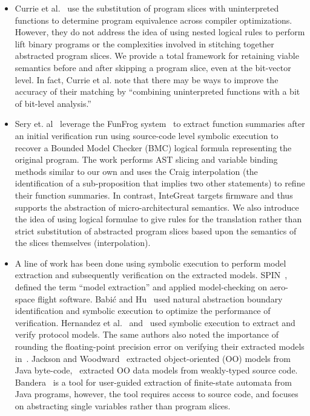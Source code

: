 \begin{itemize}
	\item Currie et al.~\cite{currie2006embedded} use the substitution of program slices with uninterpreted functions to determine program equivalence across compiler optimizations.
	However, they do not address the idea of using nested logical rules to perform lift binary programs or the complexities involved in stitching together abstracted program slices.
	We provide a total framework for retaining viable semantics before and after skipping a program slice, even at the bit-vector level.
	In fact, Currie et al. note that there may be ways to improve the accuracy of their matching by ``combining uninterpreted functions with a bit of bit-level analysis.''
	\item Sery et. al~\cite{interpolation} leverage the FunFrog system~\cite{sery2012funfrog} to extract function summaries after an initial verification run using source-code level symbolic execution to recover a Bounded Model Checker (BMC) logical formula representing the original program.
	The work performs AST slicing and variable binding methods similar to our own and uses the Craig interpolation (the identification of a sub-proposition that implies two other statements) to refine their function summaries.
	In contrast, InteGreat targets firmware and thus supports the abstraction of micro-architectural semantics.
	We also introduce the idea of using logical formulae to give rules for the translation rather than strict substitution of abstracted program slices based upon the semantics of the slices themselves (interpolation).
	\item A line of work has been done using symbolic execution to perform model extraction and subsequently verification on the extracted models.
	SPIN~\cite{spin}, defined the term ``model extraction'' and applied model-checking on aero-space flight software.
	Babi\'c and Hu~\cite{babic2007structural} used natural abstraction boundary identification and symbolic execution to optimize the performance of verification.
	Hernandez et al.~\cite{firmusb} and~\cite{cryto-symex} used symbolic execution to extract and verify protocol models.
	The same authors also noted the importance of rounding the floating-point precision error on verifying their extracted models in~\cite{precision}.
	Jackson and Woodward~\cite{lightweight-oo} extracted object-oriented (OO) models from Java byte-code,~\cite{oo-model} extracted OO data models from weakly-typed source code. 
	Bandera~\cite{tool-supported-program-abstraction} is a tool for user-guided extraction of finite-state automata from Java programs, however, the tool requires access to source code, and focuses on abstracting single variables rather than program slices.

\end{itemize}
